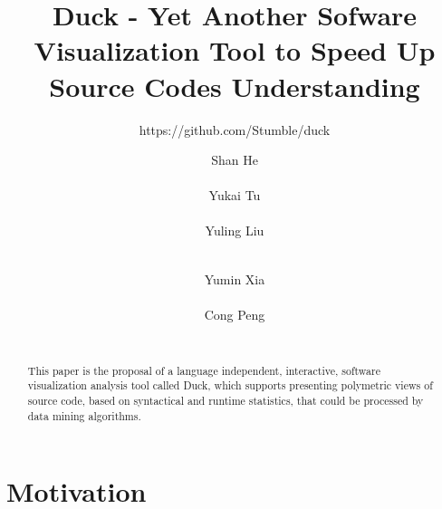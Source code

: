 \documentclass{sig-alternate}
\begin{document}
\makeatletter
\def\@copyrightspace{\relax}
\makeatother


\title{
Duck - Yet Another Sofware Visualization Tool to Speed Up Source Codes Understanding
}
\subtitle{https://github.com/Stumble/duck}

%
\author{
%
%
\alignauthor
Shan He\\
       \\
\alignauthor
Yukai Tu\\
       \\
\alignauthor
Yuling Liu\\
       \\
\and
\alignauthor
Yumin Xia\\
       \\
\alignauthor
Cong Peng\\
       \\
}

\maketitle
\begin{abstract}
This paper is the proposal of a language independent, interactive, software visualization analysis tool called Duck, which supports presenting polymetric views of source code, based on syntactical and runtime statistics, that could be processed by data mining algorithms.
\end{abstract}

\section{Motivation}
\end{document}
